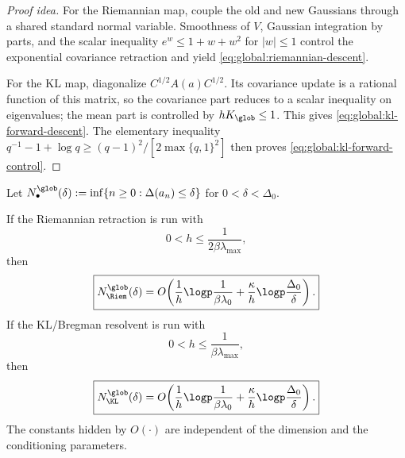 \begin{proof}[Proof idea]
For the Riemannian map, couple the old and new Gaussians through a shared standard normal variable.
Smoothness of \(V\), Gaussian integration by parts, and the scalar inequality
\(
e^w\leq1+w+w^2
\) for \(|w|\leq1\) control the exponential covariance retraction and yield
\eqref{eq:global:riemannian-descent}.

For the KL map, diagonalize
\(
C^{1/2}A(a)C^{1/2}
\).  Its covariance update is a rational function of this matrix, so the covariance part reduces
to a scalar inequality on eigenvalues; the mean part is controlled by \(hK_{\glob}\leq1\).
This gives \eqref{eq:global:kl-forward-descent}.  The elementary inequality
\(
q^{-1}-1+\log q\geq(q-1)^2/[2\max\{q,1\}^2]
\) then proves \eqref{eq:global:kl-forward-control}.
\end{proof}

\begin{theorem}
\label{thm:global:discrete-upper}
Let
\(
N_\bullet^{\glob}(\delta)
:=\inf\{n\geq0:\Delta(a_n)\leq\delta\}
\) for \(0<\delta<\Delta_0\).

If the Riemannian retraction is run with
\begin{equation}
\label{eq:global:riemannian-global-step}
    0<h\leq\frac1{2\beta\lambda_{\max}},
\end{equation}
then
\begin{equation}
\label{eq:global:riemannian-global-complexity}
    \boxed{
    N_{\Riem}^{\glob}(\delta)
    =O\!\left(
        \frac1h\logp\frac1{\beta\lambda_0}
        +\frac\kappa h\logp\frac{\Delta_0}{\delta}
    \right).}
\end{equation}
If the KL/Bregman resolvent is run with
\begin{equation}
\label{eq:global:kl-global-step}
    0<h\leq\frac1{\beta\lambda_{\max}},
\end{equation}
then
\begin{equation}
\label{eq:global:kl-global-complexity}
    \boxed{
    N_{\KL}^{\glob}(\delta)
    =O\!\left(
        \frac1h\logp\frac1{\beta\lambda_0}
        +\frac\kappa h\logp\frac{\Delta_0}{\delta}
    \right).}
\end{equation}
The constants hidden by \(O(\cdot)\) are independent of the dimension and the conditioning
parameters.
\end{theorem}

